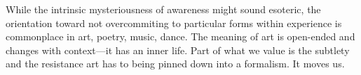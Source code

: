 \documentclass[11pt]{article}
\begin{document}
While the intrinsic mysteriousness of awareness might sound esoteric, the orientation toward not overcommiting to particular forms within experience is commonplace in art, poetry, music, dance. The meaning of art is open-ended and changes with context---it has an inner life. Part of what we value is the subtlety and the resistance art has to being pinned down into a formalism. It moves us.













\end{document}
